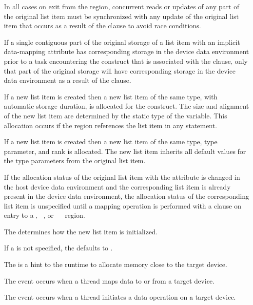 In all cases on exit from the region, concurrent reads or updates of any part of 
the original list item must be synchronized with any update of the original list 
item that occurs as a result of the  clause to avoid race conditions.

If a single contiguous part of the original storage of a list item with an
implicit data-mapping attribute has corresponding storage in the device data
environment prior to a task encountering the construct that is associated with the
 clause, only that part of the original storage will have corresponding 
storage in the device data environment as a result of the  clause.

\begin{ccppspecific}
If a new list item is created then a new list item of the same type, with 
automatic storage duration, is allocated for the construct. The size and alignment 
of the new list item are determined by the static type of the variable. This 
allocation occurs if the region references the list item in any statement.
\end{ccppspecific}

\begin{fortranspecific}
If a new list item is created then a new list item of the same type, type 
parameter, and rank is allocated.  The new list item inherits all default 
values for the type parameters from the original list item.

If the allocation status of the original list item with the
 attribute is changed in the host device data
environment and the corresponding list item is already present in the
device data environment, the allocation status of the corresponding
list item is unspecified until a mapping operation is performed with a
 clause on entry to a , ~, or
~~ region.
\end{fortranspecific}

The  determines how the new list item is initialized.

If a  is not specified, the  defaults to .

The   is a hint to the runtime to 
allocate memory close to the target device.

\events
The  event occurs when a thread maps data to or from a target device.

The  event occurs when a thread initiates a data operation 
on a target device.

